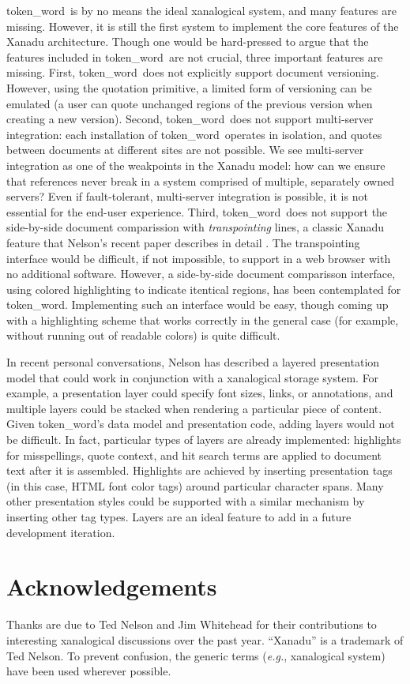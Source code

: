 \documentclass{acm_proc_article-sp}
\newcommand{\tw}{token\_word}
\begin{document}
\tw \  is by no means the ideal xanalogical system, and many features are missing.
However, it is still the first system to implement the core features of the Xanadu architecture.
Though one would be hard-pressed to argue that the features included in \tw \  are not crucial, three important features are missing.
First, \tw \  does not explicitly support document versioning.
However, using the quotation primitive, a limited form of versioning can be emulated (a user can quote unchanged regions of the previous version when creating a new version).
Second, \tw \  does not support multi-server integration:  each installation of \tw \  operates in isolation, and quotes between documents at different sites are not possible.
We see multi-server integration as one of the weakpoints in the Xanadu model:  how can we ensure that references never break in a system comprised of multiple, separately owned servers?
Even if fault-tolerant, multi-server integration is possible, it is not essential for the end-user experience. 
Third, \tw \   does not support the side-by-side document comparission with {\it transpointing} lines, a classic Xanadu feature that Nelson's recent paper describes in detail \cite{Nelson1999}.
The transpointing interface would be difficult, if not impossible, to support in a web browser with no additional software.
However, a side-by-side document comparisson interface, using colored highlighting to indicate itentical regions, has been contemplated for \tw.
Implementing such an interface would be easy, though coming up with a highlighting scheme that works correctly in the general case (for example, without running out of readable colors) is quite difficult.

In recent personal conversations, Nelson has described a layered presentation model that could work in conjunction with a xanalogical storage system.
For example, a presentation layer could specify font sizes, links, or annotations, and multiple layers could be stacked when rendering a particular piece of content.
Given \tw's data model and presentation code, adding layers would not be difficult.
In fact, particular types of layers are already implemented:  highlights for misspellings, quote context, and hit search terms are applied to document text after it is assembled.
Highlights are achieved by inserting presentation tags (in this case, HTML font color tags) around particular character spans.
Many other presentation styles could be supported with a similar mechanism by inserting other tag types.
Layers are an ideal feature to add in a future development iteration.

\section{Acknowledgements}
Thanks are due to Ted Nelson and Jim Whitehead for their contributions to interesting xanalogical discussions over the past year. ``Xanadu'' is a trademark of Ted Nelson.  To prevent confusion, the generic terms ({\it e.g.}, xanalogical system) have been used wherever possible.



\end{document}
